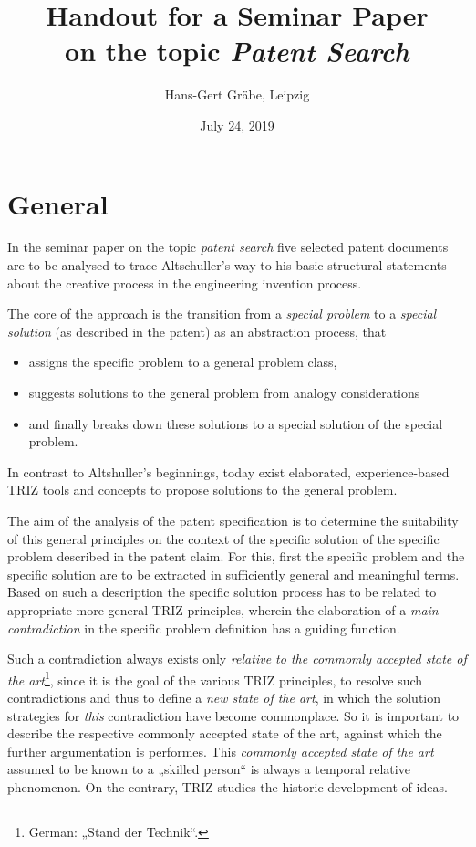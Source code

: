 \documentclass[11pt,a4paper]{article}
\title{Handout for a Seminar Paper \\[4pt] on the topic \emph{Patent Search}}
\author{Hans-Gert Gr\"abe, Leipzig}
\date{July 24, 2019}
\begin{document}
\maketitle

\section{General}

In the seminar paper on the topic \emph{patent search} five selected patent
documents are to be analysed to trace Altschuller's way to his basic
structural statements about the creative process in the engineering invention
process.

The core of the approach is the transition from a \emph{special problem} to a
\emph{special solution} (as described in the patent) as an abstraction
process, that
\begin{itemize}
\item assigns the specific problem to a general problem class,
\item suggests solutions to the general problem from analogy considerations   
\item and finally breaks down these solutions to a special solution of the
  special problem.
\end{itemize}
In contrast to Altshuller's beginnings, today exist elaborated,
experience-based TRIZ tools and concepts to propose solutions to the general
problem.

The aim of the analysis of the patent specification is to determine the
suitability of this general principles on the context of the specific solution
of the specific problem described in the patent claim. For this, first the
specific problem and the specific solution are to be extracted in sufficiently
general and meaningful terms.  Based on such a description the specific
solution process has to be related to appropriate more general TRIZ
principles, wherein the elaboration of a \emph{main contradiction} in the
specific problem definition has a guiding function.

Such a contradiction always exists only \emph{relative to the commomly
  accepted state of the art}\footnote{German: „Stand der Technik“.}, since it
is the goal of the various TRIZ principles, to resolve such contradictions and
thus to define a \emph{new state of the art}, in which the solution strategies
for \emph{this} contradiction have become commonplace. So it is important to
describe the respective commonly accepted state of the art, against which the
further argumentation is performes. This \emph{commonly accepted state of the
  art} assumed to be known to a „skilled person“ is always a temporal relative
phenomenon. On the contrary, TRIZ studies the historic development of ideas.
\end{document}

